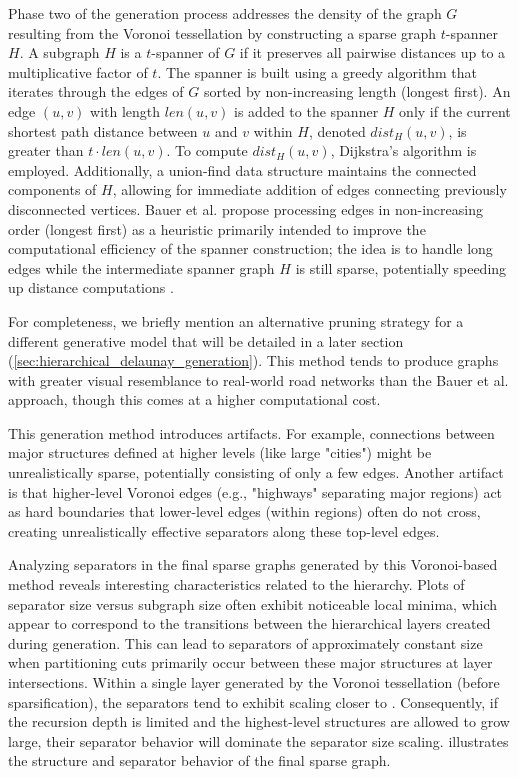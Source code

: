 Phase two of the generation process addresses the density of the graph \(G\) resulting from the Voronoi tessellation by constructing a sparse graph \(t\)-spanner \(H\).
A subgraph \(H\) is a \(t\)-spanner of \(G\) if it preserves all pairwise distances up to a multiplicative factor of \(t\).
The spanner is built using a greedy algorithm that iterates through the edges of \(G\) sorted by non-increasing length (longest first).
An edge \((u, v)\) with length \(len(u, v)\) is added to the spanner \(H\) only if the current shortest path distance between \(u\) and \(v\) within \(H\), denoted \(dist_H(u, v)\), is greater than \(t \cdot len(u, v)\).
To compute \(dist_H(u, v)\), Dijkstra's algorithm is employed.
Additionally, a union-find data structure maintains the connected components of \(H\), allowing for immediate addition of edges connecting previously disconnected vertices.
Bauer et al. propose processing edges in non-increasing order (longest first) as a heuristic primarily intended to improve the computational efficiency of the spanner construction; the idea is to handle long edges while the intermediate spanner graph \(H\) is still sparse, potentially speeding up distance computations \cite{hutchison_synthetic_2010}.

For completeness, we briefly mention an alternative pruning strategy for a different generative model that will be detailed in a later section (\cref{sec:hierarchical_delaunay_generation}).
This method tends to produce graphs with greater visual resemblance to real-world road networks than the Bauer et al. approach, though this comes at a higher computational cost.

This generation method introduces artifacts.
For example, connections between major structures defined at higher levels (like large "cities") might be unrealistically sparse, potentially consisting of only a few edges.
Another artifact is that higher-level Voronoi edges (e.g., "highways" separating major regions) act as hard boundaries that lower-level edges (within regions) often do not cross, creating unrealistically effective separators along these top-level edges.

Analyzing separators in the final sparse graphs generated by this Voronoi-based method reveals interesting characteristics related to the hierarchy.
Plots of separator size versus subgraph size often exhibit noticeable local minima, which appear to correspond to the transitions between the hierarchical layers created during generation.
This can lead to separators of approximately constant size when partitioning cuts primarily occur between these major structures at layer intersections.
Within a single layer generated by the Voronoi tessellation (before sparsification), the separators tend to exhibit scaling closer to .
Consequently, if the recursion depth is limited and the highest-level structures are allowed to grow large, their  separator behavior will dominate the separator size scaling.
 illustrates the structure and separator behavior of the final sparse graph.

